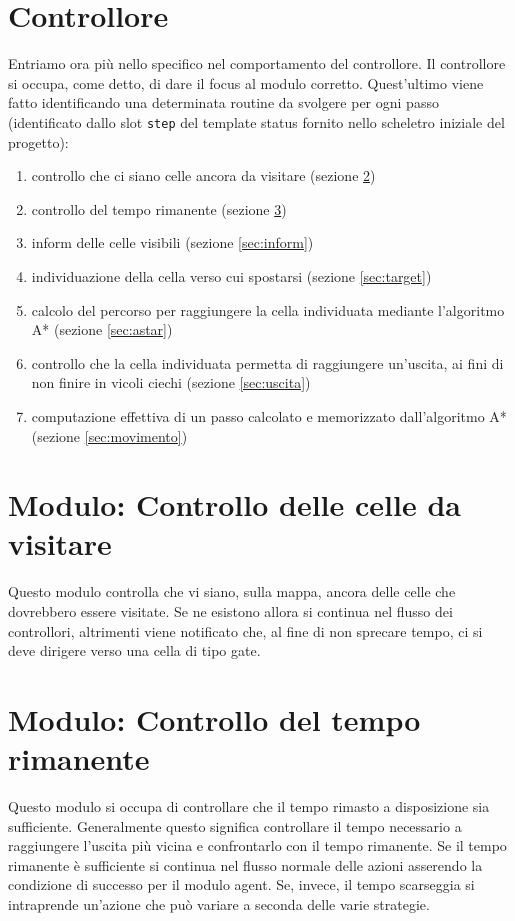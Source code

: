 \section{Controllore} \label{sec:controllore}
Entriamo ora più nello specifico nel comportamento del controllore. Il controllore si occupa, come detto, di dare il focus al modulo corretto. Quest'ultimo viene fatto identificando una determinata routine da svolgere per ogni passo (identificato dallo slot \texttt{step} del template status fornito nello scheletro iniziale del progetto):
\begin{enumerate}
	\item controllo che ci siano celle ancora da visitare (sezione \ref{sec:finish})
	\item controllo del tempo rimanente (sezione \ref{sec:tempo})
	\item inform delle celle visibili (sezione \ref{sec:inform})
	\item individuazione della cella verso cui spostarsi (sezione \ref{sec:target})
	\item calcolo del percorso per raggiungere la cella individuata mediante l'algoritmo A* (sezione \ref{sec:astar})
	\item controllo che la cella individuata permetta di raggiungere un'uscita, ai fini di non finire in vicoli ciechi (sezione \ref{sec:uscita})
	\item computazione effettiva di un passo calcolato e memorizzato dall'algoritmo A* (sezione \ref{sec:movimento})
\end{enumerate}

\section{Modulo: Controllo delle celle da visitare} \label{sec:finish}
Questo modulo controlla che vi siano, sulla mappa, ancora delle celle che dovrebbero essere visitate. Se ne esistono allora si continua nel flusso dei controllori, altrimenti viene notificato che, al fine di non sprecare tempo, ci si deve dirigere verso una cella di tipo gate.

\section{Modulo: Controllo del tempo rimanente} \label{sec:tempo}
Questo modulo si occupa di controllare che il tempo rimasto a disposizione sia sufficiente. Generalmente questo significa controllare il tempo necessario a raggiungere l'uscita più vicina e confrontarlo con il tempo rimanente. Se il tempo rimanente è sufficiente si continua nel flusso normale delle azioni asserendo la condizione di successo per il modulo agent. Se, invece, il tempo scarseggia si intraprende un'azione che può variare a seconda delle varie strategie.

